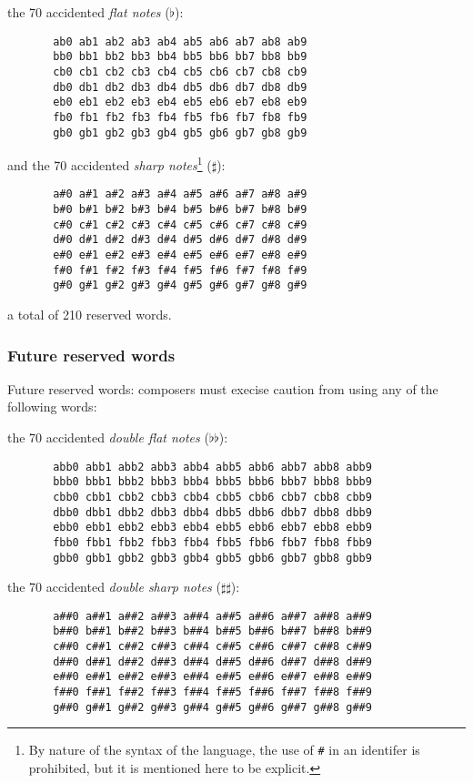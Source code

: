 the 70 accidented \textit{flat notes} ($\flat$):

\begin{verbatim}
       ab0 ab1 ab2 ab3 ab4 ab5 ab6 ab7 ab8 ab9
       bb0 bb1 bb2 bb3 bb4 bb5 bb6 bb7 bb8 bb9
       cb0 cb1 cb2 cb3 cb4 cb5 cb6 cb7 cb8 cb9
       db0 db1 db2 db3 db4 db5 db6 db7 db8 db9
       eb0 eb1 eb2 eb3 eb4 eb5 eb6 eb7 eb8 eb9
       fb0 fb1 fb2 fb3 fb4 fb5 fb6 fb7 fb8 fb9
       gb0 gb1 gb2 gb3 gb4 gb5 gb6 gb7 gb8 gb9
\end{verbatim}

and the 70 accidented \textit{sharp notes}\footnote{By nature of the syntax of
the language, the use of \protect\texttt{\#} in an identifer is prohibited,
but it is mentioned here to be explicit.} ($\sharp$):
\begin{verbatim}
       a#0 a#1 a#2 a#3 a#4 a#5 a#6 a#7 a#8 a#9
       b#0 b#1 b#2 b#3 b#4 b#5 b#6 b#7 b#8 b#9
       c#0 c#1 c#2 c#3 c#4 c#5 c#6 c#7 c#8 c#9
       d#0 d#1 d#2 d#3 d#4 d#5 d#6 d#7 d#8 d#9
       e#0 e#1 e#2 e#3 e#4 e#5 e#6 e#7 e#8 e#9
       f#0 f#1 f#2 f#3 f#4 f#5 f#6 f#7 f#8 f#9
       g#0 g#1 g#2 g#3 g#4 g#5 g#6 g#7 g#8 g#9
\end{verbatim}

a total of 210 reserved words.


\subsubsection{Future reserved words}

\np Future reserved words: composers must execise caution from using any
of the following words:

the 70 accidented \textit{double flat notes} ($\flat\flat$):

\begin{verbatim}
       abb0 abb1 abb2 abb3 abb4 abb5 abb6 abb7 abb8 abb9
       bbb0 bbb1 bbb2 bbb3 bbb4 bbb5 bbb6 bbb7 bbb8 bbb9
       cbb0 cbb1 cbb2 cbb3 cbb4 cbb5 cbb6 cbb7 cbb8 cbb9
       dbb0 dbb1 dbb2 dbb3 dbb4 dbb5 dbb6 dbb7 dbb8 dbb9
       ebb0 ebb1 ebb2 ebb3 ebb4 ebb5 ebb6 ebb7 ebb8 ebb9
       fbb0 fbb1 fbb2 fbb3 fbb4 fbb5 fbb6 fbb7 fbb8 fbb9
       gbb0 gbb1 gbb2 gbb3 gbb4 gbb5 gbb6 gbb7 gbb8 gbb9
\end{verbatim}

the 70 accidented \textit{double sharp notes} ($\sharp\sharp$):

\begin{verbatim}
       a##0 a##1 a##2 a##3 a##4 a##5 a##6 a##7 a##8 a##9
       b##0 b##1 b##2 b##3 b##4 b##5 b##6 b##7 b##8 b##9
       c##0 c##1 c##2 c##3 c##4 c##5 c##6 c##7 c##8 c##9
       d##0 d##1 d##2 d##3 d##4 d##5 d##6 d##7 d##8 d##9
       e##0 e##1 e##2 e##3 e##4 e##5 e##6 e##7 e##8 e##9
       f##0 f##1 f##2 f##3 f##4 f##5 f##6 f##7 f##8 f##9
       g##0 g##1 g##2 g##3 g##4 g##5 g##6 g##7 g##8 g##9
\end{verbatim}

